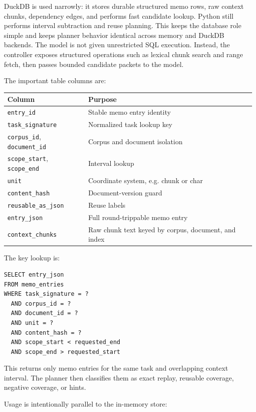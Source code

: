 \documentclass[11pt]{article}
\begin{document}
DuckDB is used narrowly: it stores durable structured memo rows, raw context
chunks, dependency edges, and performs fast candidate lookup. Python still
performs interval subtraction and reuse planning. This keeps the database role
simple and keeps planner behavior identical across memory and DuckDB backends.
The model is not given unrestricted SQL execution. Instead, the controller
exposes structured operations such as lexical chunk search and range fetch, then
passes bounded candidate packets to the model.

The important table columns are:

\begin{center}
\begin{tabular}{ll}
\toprule
\textbf{Column} & \textbf{Purpose} \\
\midrule
\texttt{entry\_id} & Stable memo entry identity \\
\texttt{task\_signature} & Normalized task lookup key \\
\texttt{corpus\_id}, \texttt{document\_id} & Corpus and document isolation \\
\texttt{scope\_start}, \texttt{scope\_end} & Interval lookup \\
\texttt{unit} & Coordinate system, e.g. chunk or char \\
\texttt{content\_hash} & Document-version guard \\
\texttt{reusable\_as\_json} & Reuse labels \\
\texttt{entry\_json} & Full round-trippable memo entry \\
\texttt{context\_chunks} & Raw chunk text keyed by corpus, document, and index \\
\bottomrule
\end{tabular}
\end{center}

The key lookup is:

\begin{verbatim}
SELECT entry_json
FROM memo_entries
WHERE task_signature = ?
  AND corpus_id = ?
  AND document_id = ?
  AND unit = ?
  AND content_hash = ?
  AND scope_start < requested_end
  AND scope_end > requested_start
\end{verbatim}

This returns only memo entries for the same task and overlapping context
interval. The planner then classifies them as exact replay, reusable coverage,
negative coverage, or hints.

Usage is intentionally parallel to the in-memory store:
\end{document}
